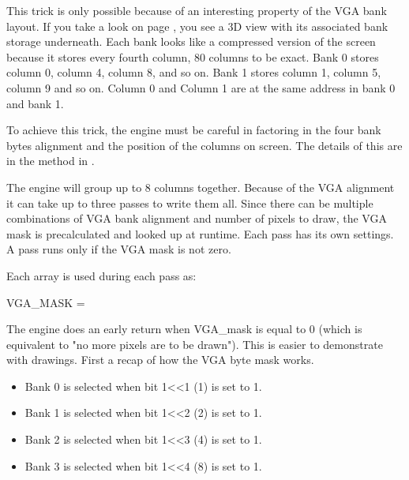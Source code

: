 This trick is only possible because of an interesting property of the VGA bank layout. If you take a look on page \pageref{vga_layout}, you see a 3D view with its associated bank storage underneath. Each bank looks like a compressed version of the screen because it stores every fourth column, 80 columns to be exact. Bank 0 stores column 0, column 4, column 8, and so on. Bank 1 stores column 1, column 5, column 9 and so on. Column 0 and Column 1 are at the same address in bank 0 and bank 1.
 \par
  \begin{minipage}{\textwidth}
 
\centering
\vspace*{0.3cm}
\label{vga_layout}
\centering


 \end{minipage}

\par
\bigskip
To achieve this trick, the engine must be careful in factoring in the four bank bytes alignment and the position of the columns on screen. The details of this are in the method  in .\\
\par 
\begin{minipage}{\textwidth}

\end{minipage}
The engine will group up to 8 columns together. Because of the VGA alignment it can take up to three passes to write them all. Since there can be multiple combinations of VGA bank alignment and number of pixels to draw, the VGA mask is precalculated and looked up at runtime. Each pass has its own settings. A pass runs only if the VGA mask is not zero.\\

 \par
 \begin{minipage}{\textwidth}

\end{minipage}
Each  array is used during each pass  as:\\
\par
 VGA\_MASK = \\
 \par
 The engine does an early return when VGA\_mask is equal to 0 (which is equivalent to "no more pixels are to be drawn"). This is easier to demonstrate with drawings. First a recap of how the VGA byte mask works.
\begin{itemize}
\item Bank 0 is selected when bit 1<<1 (1) is set to 1.
\item Bank 1 is selected when bit 1<<2 (2) is set to 1.
\item Bank 2 is selected when bit 1<<3 (4) is set to 1.
\item Bank 3 is selected when bit 1<<4 (8) is set to 1.
\end{itemize}
\par


